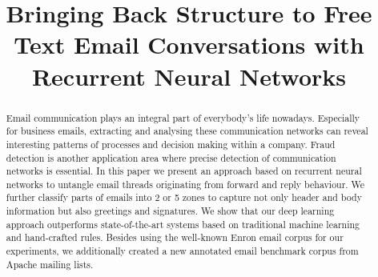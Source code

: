 \documentclass{llncs}
\begin{document}
%
\frontmatter          %
%
\pagestyle{headings}  %

\mainmatter              %
%
\title{Bringing Back Structure to Free Text Email Conversations with Recurrent Neural Networks}
%
%
%
%
%


\maketitle              %

\begin{abstract}
Email communication plays an integral part of everybody's life nowadays.
Especially for business emails, extracting and analysing these communication networks can reveal interesting patterns of processes and decision making within a company.
Fraud detection is another application area where precise detection of communication networks is essential.
In this paper we present an approach based on recurrent neural networks to untangle email threads originating from forward and reply behaviour.
We further classify parts of emails into 2 or 5 zones to capture not only header and body information but also greetings and signatures.
We show that our deep learning approach outperforms state-of-the-art systems based on traditional machine learning and hand-crafted rules.
Besides using the well-known Enron email corpus for our experiments, we additionally created a new annotated email benchmark corpus from Apache mailing lists.
\end{abstract}
%
\end{document}
